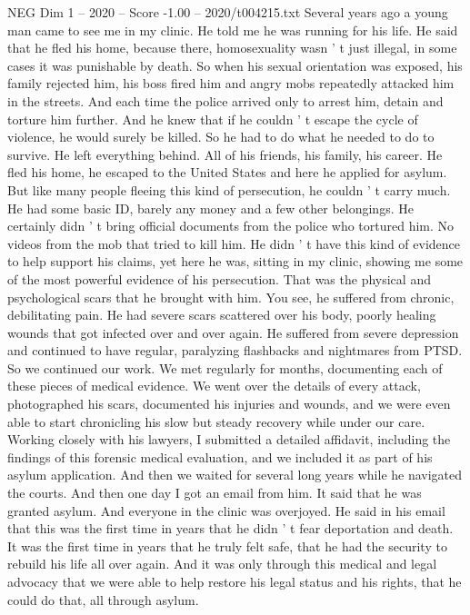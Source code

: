 \begin{textsample}{NEG Dim 1 – 2020 – Score -1.00 – 2020/t004215.txt}  \label{ex:f1_neg_007}
Several years ago a young man came to see me in my clinic.
He told me he was running for his life.
He said that he fled his home, because there, homosexuality wasn ' t just illegal, in some cases it was punishable by death.
So when his sexual orientation was exposed, his family rejected him, his boss fired him and angry mobs repeatedly attacked him in the streets.
And each time the police arrived only to arrest him, detain and torture him further.
And he knew that if he couldn ' t escape the cycle of violence, he would surely be killed.
So he had to do what he needed to do to survive.
He left everything behind.
All of his friends, his family, his career.
He fled his home, he escaped to the United States and here he applied for asylum.
But like many people fleeing this kind of persecution, he couldn ' t carry much.
He had some basic ID, barely any money and a few other belongings.
He certainly didn ' t bring official documents from the police who tortured him.
No videos from the mob that tried to kill him.
He didn ' t have this kind of evidence to help support his claims, yet here he was, sitting in my clinic, showing me some of the most powerful evidence of his persecution.
That was the physical and psychological scars that he brought with him.
You see, he suffered from chronic, debilitating pain.
He had severe scars scattered over his body, poorly healing wounds that got infected over and over again.
He suffered from severe depression and continued to have regular, paralyzing flashbacks and nightmares from PTSD.
So we continued our work.
We met regularly for months, documenting each of these pieces of medical evidence.
We went over the details of every attack, photographed his scars, documented his injuries and wounds, and we were even able to start chronicling his slow but steady recovery while under our care.
Working closely with his lawyers, I submitted a detailed affidavit, including the findings of this forensic medical evaluation, and we included it as part of his asylum application.
And then we waited for several long years while he navigated the courts.
And then one day I got an email from him.
It said that he was granted asylum.
And everyone in the clinic was overjoyed.
He said in his email that this was the first time in years that he didn ' t fear deportation and death.
It was the first time in years that he truly felt safe, that he had the security to rebuild his life all over again.
And it was only through this medical and legal advocacy that we were able to help restore his legal status and his rights, that he could do that, all through asylum.

\end{textsample}
